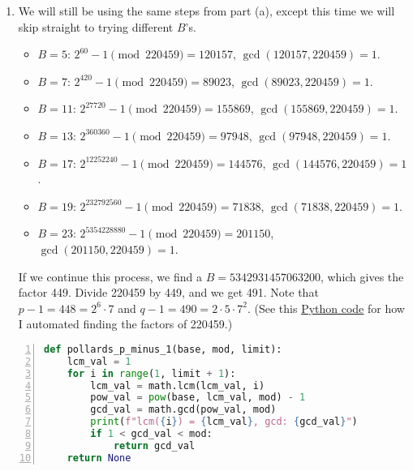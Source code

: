 {\begin{enumerate}
        \item We will still be using the same steps from part (a), except this time we will skip straight to trying different \(B\)'s.
              \begin{itemize}
                  \item \(B = 5\): \(2^{60} - 1 \pmod{220459} = 120157\), \(\gcd(120157, 220459) = 1\).
                  \item \(B = 7\): \(2^{420} - 1 \pmod{220459} = 89023\), \(\gcd(89023, 220459) = 1\).
                  \item \(B = 11\): \(2^{27720} - 1 \pmod{220459} = 155869\), \(\gcd(155869, 220459) = 1\).
                  \item \(B = 13\): \(2^{360360} - 1 \pmod{220459} = 97948\), \(\gcd(97948, 220459) = 1\).
                  \item \(B = 17\): \(2^{12252240} - 1 \pmod{220459} = 144576\), \(\gcd(144576, 220459) = 1\).
                  \item \(B = 19\): \(2^{232792560} - 1 \pmod{220459} = 71838\), \(\gcd(71838, 220459) = 1\).
                  \item \(B = 23\): \(2^{5354228880} - 1 \pmod{220459} = 201150\), \(\gcd(201150, 220459) = 1\).
              \end{itemize}
              If we continue this process, we find a \(B = 5342931457063200\), which gives the factor 449. Divide 220459 by 449, and we get 491. Note that \(p - 1 = 448 = 2^6 \cdot 7\) and \(q - 1 = 490 = 2 \cdot 5 \cdot 7^2\). (See this \hyperref[pollard's p python]{Python code} for how I automated finding the factors of 220459.)
    \end{enumerate}
}

\begin{center}
    \label{pollard's p python}
    \begin{lstlisting}[language=Python, numbers=left]
    def pollards_p_minus_1(base, mod, limit):
    lcm_val = 1
    for i in range(1, limit + 1):
        lcm_val = math.lcm(lcm_val, i)
        pow_val = pow(base, lcm_val, mod) - 1
        gcd_val = math.gcd(pow_val, mod)
        print(f"lcm({i}) = {lcm_val}, gcd: {gcd_val}")
        if 1 < gcd_val < mod:
            return gcd_val
    return None
\end{lstlisting}
\end{center}

